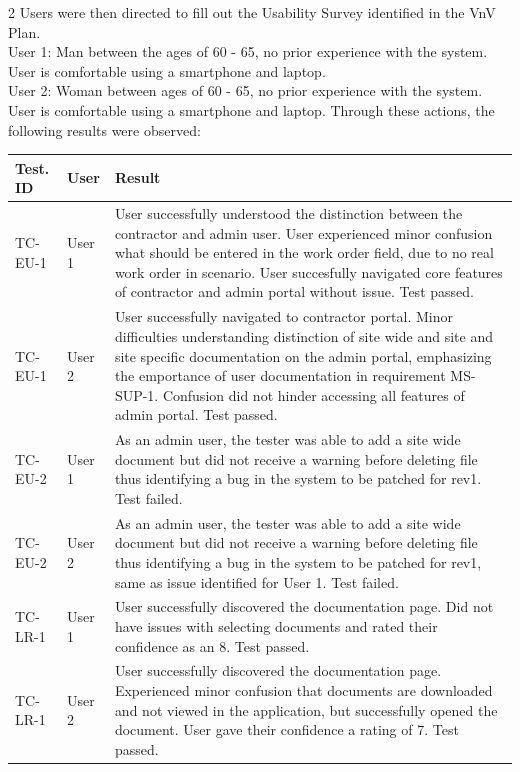 \documentclass[12pt, titlepage]{article}
\begin{document}
2 Users were then directed to fill out the Usability Survey
identified in the VnV Plan.\\
User 1: Man between the ages of 60 - 65, no prior experience with the
system. User is comfortable using a smartphone and laptop.\\
User 2: Woman between ages of 60 - 65, no prior experience with the
system. User is comfortable using a smartphone and laptop.
Through these actions, the following results were observed:\\
\begin{longtable}{|m{2cm}|m{1.5cm}|m{9cm}|}
  \hline
  \textbf{Test. ID}  & \textbf{User} & \textbf{Result} \\
  \hline
  TC-EU-1 & User 1& User successfully understood the distinction
  between the contractor and admin user. User experienced minor
  confusion what should be entered in the work order field, due to no
  real work order in scenario. User succesfully navigated core
  features of contractor
  and admin portal without issue. Test passed.\\
  \hline
  TC-EU-1 & User 2& User successfully navigated to contractor portal.
  Minor difficulties understanding distinction of site wide and
  site and site specific documentation on the admin portal,
  emphasizing the emportance of user documentation in requirement MS-SUP-1.
  Confusion did not hinder accessing all features of admin portal.
  Test passed.\\
  \hline
  TC-EU-2 & User 1& As an admin user, the tester was able to add a
  site wide document but did not receive a warning before deleting file
  thus identifying a bug in the system to be patched for rev1. Test failed.\\
  \hline
  TC-EU-2 & User 2& As an admin user, the tester was able to add a
  site wide document but did not receive a warning before deleting file
  thus identifying a bug in the system to be patched for rev1, same
  as issue identified for User 1. Test failed.\\
  \hline
  TC-LR-1 & User 1& User successfully discovered the documentation
  page. Did not have issues with selecting documents and
  rated their confidence as an 8. Test passed. \\
  \hline
  TC-LR-1& User 2& User successfully discovered the documentation
  page. Experienced minor confusion that documents are downloaded
  and not viewed in the application, but successfully opened the
  document. User gave their confidence a rating of 7. Test passed.\\

\end{longtable}
\end{document}
